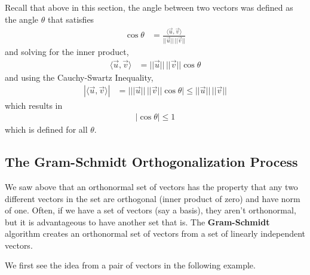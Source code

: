 Recall that above in this section, the angle between two vectors was defined as the angle $\theta$ that satisfies
%
\begin{align*}
\cos \theta & = \frac{\langle \vec{u}, \vec{v} \rangle}{||\vec{u}||\, ||\vec{v}||} 
\end{align*}
and solving for the inner product,
%
\begin{align*}
\langle \vec{u}, \vec{v} \rangle & = ||\vec{u}||\, ||\vec{v}|| \cos \theta 
\end{align*}
and using the Cauchy-Swartz Inequality, 
%
\begin{align*}
|\langle \vec{u}, \vec{v} \rangle | & = \bigl\vert ||\vec{u}||\, ||\vec{v}|| \cos \theta \bigr\vert 
\leq  ||\vec{u}||\, ||\vec{v}|| 
\end{align*}
which results in 
%
\begin{align*}
|\cos \theta| \leq 1
\end{align*}
which is defined for all $\theta$.  

\subsection{The Gram-Schmidt Orthogonalization Process} 

We saw above that an orthonormal set of vectors has the property that any two different vectors in the set are orthogonal (inner product of zero) and have norm of one.   Often, if we have a set of vectors (say a basis), they aren't orthonormal, but it is advantageous to have another set that is.  The \textbf{Gram-Schmidt} algorithm creates an orthonormal set of vectors from a set of linearly independent vectors.  

We first see the idea from a pair of vectors in the following example. 


